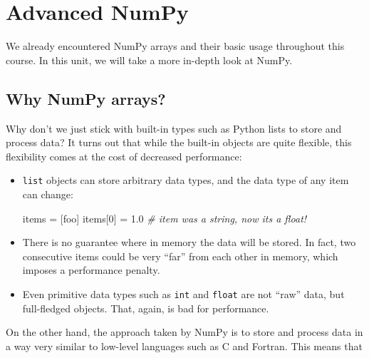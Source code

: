 \documentclass{scrartcl}
\newenvironment{Shaded}{}{}
\newcommand{\DecValTok}[1]{\textcolor[rgb]{0.25,0.63,0.44}{{#1}}}
\newcommand{\FloatTok}[1]{\textcolor[rgb]{0.25,0.63,0.44}{{#1}}}
\newcommand{\StringTok}[1]{\textcolor[rgb]{0.25,0.44,0.63}{{#1}}}
\newcommand{\CommentTok}[1]{\textcolor[rgb]{0.38,0.63,0.69}{\textit{{#1}}}}
\newcommand{\NormalTok}[1]{{#1}}
\newcommand{\OperatorTok}[1]{\textcolor[rgb]{0.40,0.40,0.40}{{#1}}}
\begin{document}
    
    \maketitle
    \tableofcontents
    
    

    
    \hypertarget{advanced-numpy}{%
\section{Advanced NumPy}\label{advanced-numpy}}

We already encountered NumPy arrays and their basic usage throughout
this course. In this unit, we will take a more in-depth look at NumPy.

    \hypertarget{why-numpy-arrays}{%
\subsection{Why NumPy arrays?}\label{why-numpy-arrays}}

Why don't we just stick with built-in types such as Python lists to
store and process data? It turns out that while the built-in objects are
quite flexible, this flexibility comes at the cost of decreased
performance:

\begin{itemize}
\item
  \texttt{list} objects can store arbitrary data types, and the data
  type of any item can change:

\begin{Shaded}
\begin{Highlighting}[]
\NormalTok{items }\OperatorTok{=}\NormalTok{ [}\StringTok{\textquotesingle{}foo\textquotesingle{}}\NormalTok{]}
\NormalTok{items[}\DecValTok{0}\NormalTok{] }\OperatorTok{=} \FloatTok{1.0}      \CommentTok{\# item was a string, now it\textquotesingle{}s a float!}
\end{Highlighting}
\end{Shaded}
\item
  There is no guarantee where in memory the data will be stored. In
  fact, two consecutive items could be very ``far'' from each other in
  memory, which imposes a performance penalty.
\item
  Even primitive data types such as \texttt{int} and \texttt{float} are
  not ``raw'' data, but full-fledged objects. That, again, is bad for
  performance.
\end{itemize}

On the other hand, the approach taken by NumPy is to store and process
data in a way very similar to low-level languages such as C and Fortran.
This means that
\end{document}

